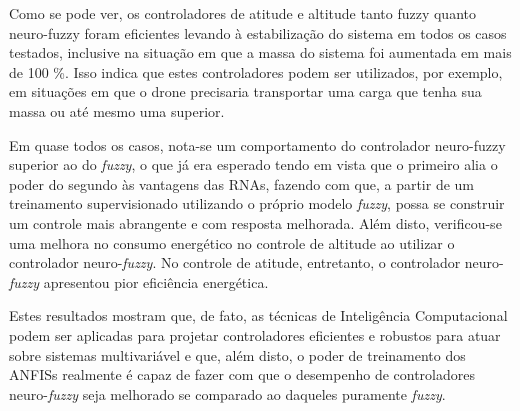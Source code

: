 Como se pode ver, os controladores de atitude e altitude tanto fuzzy quanto neuro-fuzzy foram eficientes levando à estabilização do sistema em todos os casos testados, inclusive na situação em que a massa do sistema foi aumentada em mais de 100 \%. Isso indica que estes controladores podem ser utilizados, por exemplo, em situações em que o drone precisaria transportar uma carga que tenha sua massa ou até mesmo uma superior.

Em quase todos os casos, nota-se um comportamento do controlador neuro-fuzzy superior ao do \textit{fuzzy}, o que já era esperado tendo em vista que o primeiro alia o poder do segundo às vantagens das RNAs, fazendo com que, a partir de um treinamento supervisionado utilizando o próprio modelo \textit{fuzzy}, possa se construir um controle mais abrangente e com resposta melhorada. Além disto, verificou-se uma melhora no consumo energético no controle de altitude ao utilizar o controlador neuro-\textit{fuzzy}. No controle de atitude, entretanto, o controlador neuro-\textit{fuzzy} apresentou pior eficiência energética.

Estes resultados mostram que, de fato, as técnicas de Inteligência Computacional podem ser aplicadas para projetar controladores eficientes e robustos para atuar sobre sistemas multivariável e que, além disto, o poder de treinamento dos ANFISs realmente é capaz de fazer com que o desempenho de controladores neuro-\textit{fuzzy} seja melhorado se comparado ao daqueles puramente \textit{fuzzy}.
